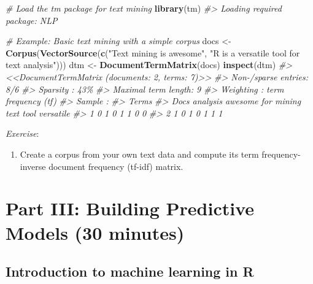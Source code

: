 \documentclass[
]{book}
\newenvironment{Shaded}{\begin{snugshade}}{\end{snugshade}}
\newcommand{\CommentTok}[1]{\textcolor[rgb]{0.56,0.35,0.01}{\textit{#1}}}
\newcommand{\FunctionTok}[1]{\textcolor[rgb]{0.13,0.29,0.53}{\textbf{#1}}}
\newcommand{\NormalTok}[1]{#1}
\newcommand{\OtherTok}[1]{\textcolor[rgb]{0.56,0.35,0.01}{#1}}
\newcommand{\StringTok}[1]{\textcolor[rgb]{0.31,0.60,0.02}{#1}}
\providecommand{\tightlist}{%
  \setlength{\itemsep}{0pt}\setlength{\parskip}{0pt}}
\begin{document}
\begin{Shaded}
\begin{Highlighting}[]

\CommentTok{\# Load the \textquotesingle{}tm\textquotesingle{} package for text mining}
\FunctionTok{library}\NormalTok{(tm)}
\CommentTok{\#\textgreater{} Loading required package: NLP}

\CommentTok{\# Example: Basic text mining with a simple corpus}
\NormalTok{docs }\OtherTok{\textless{}{-}} \FunctionTok{Corpus}\NormalTok{(}\FunctionTok{VectorSource}\NormalTok{(}\FunctionTok{c}\NormalTok{(}\StringTok{"Text mining is awesome"}\NormalTok{, }\StringTok{"R is a versatile tool for text analysis"}\NormalTok{)))}
\NormalTok{dtm }\OtherTok{\textless{}{-}} \FunctionTok{DocumentTermMatrix}\NormalTok{(docs)}
\FunctionTok{inspect}\NormalTok{(dtm)}
\CommentTok{\#\textgreater{} \textless{}\textless{}DocumentTermMatrix (documents: 2, terms: 7)\textgreater{}\textgreater{}}
\CommentTok{\#\textgreater{} Non{-}/sparse entries: 8/6}
\CommentTok{\#\textgreater{} Sparsity           : 43\%}
\CommentTok{\#\textgreater{} Maximal term length: 9}
\CommentTok{\#\textgreater{} Weighting          : term frequency (tf)}
\CommentTok{\#\textgreater{} Sample             :}
\CommentTok{\#\textgreater{}     Terms}
\CommentTok{\#\textgreater{} Docs analysis awesome for mining text tool versatile}
\CommentTok{\#\textgreater{}    1        0       1   0      1    1    0         0}
\CommentTok{\#\textgreater{}    2        1       0   1      0    1    1         1}
\end{Highlighting}
\end{Shaded}

\emph{Exercise}:

\begin{enumerate}
\def\labelenumi{\arabic{enumi}.}
\setcounter{enumi}{1}
\tightlist
\item
  Create a corpus from your own text data and compute its term frequency-inverse document frequency (tf-idf) matrix.
\end{enumerate}

\chapter*{Part III: Building Predictive Models (30 minutes)}\label{part-iii-building-predictive-models-30-minutes}

\section*{Introduction to machine learning in R}\label{introduction-to-machine-learning-in-r}
\end{document}
